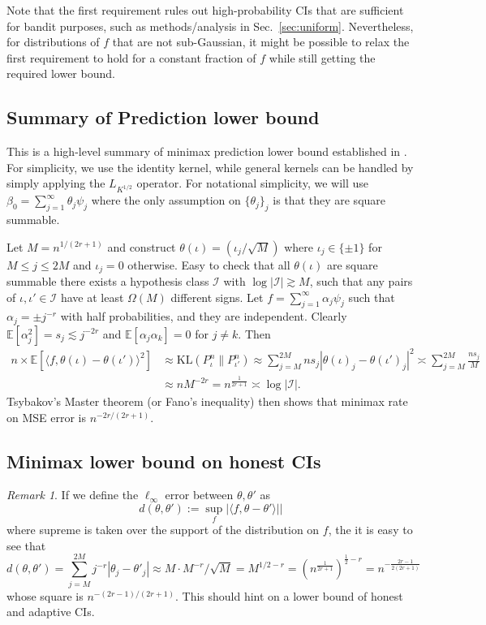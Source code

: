 \documentclass[11pt,a4paper]{article}
\theoremstyle{definition}
\theoremstyle{plain}
\theoremstyle{remark}
\newtheorem{remark}{Remark}[section]
\begin{document}
Note that the first requirement rules out high-probability CIs that are sufficient for bandit purposes, such as methods/analysis in Sec.~\ref{sec:uniform}.
Nevertheless, for distributions of $f$ that are not sub-Gaussian, it might be possible to relax the first requirement to hold for a constant fraction of $f$ while still getting the required lower bound.

\subsection{Summary of Prediction lower bound}

This is a high-level summary of minimax prediction lower bound established in \cite{cai2012minimax}. For simplicity, we use the identity kernel, while general kernels can be handled by simply
applying the $L_{K^{1/2}}$ operator. For notational simplicity, we will use $\beta_0=\sum_{j=1}^{\infty}\theta_j\psi_j$ where the only assumption on $\{\theta_j\}_j$ is that they are square summable.

Let $M=n^{1/(2r+1)}$ and construct $\theta(\iota) = (\iota_j/\sqrt{M})$ where $\iota_j\in\{\pm 1\}$ for $M\leq j\leq 2M$ and $\iota_j=0$ otherwise. Easy to check that all $\theta(\iota)$ are square summable
there exists a hypothesis class $\mathcal I$ with $\log|\mathcal I|\gtrsim M$, such that any pairs of $\iota,\iota'\in\mathcal I$ have at least $\Omega(M)$ different signs.
Let $f=\sum_{j=1}^{\infty}\alpha_j\psi_j$ such that $\alpha_j = \pm j^{-r}$ with half probabilities, and they are independent. Clearly $\mathbb E[\alpha_j^2]=s_j\lesssim j^{-2r}$ and $\mathbb E[\alpha_j\alpha_k]=0$ for $j\neq k$.
Then
\begin{align*}
n\times \mathbb E[\langle f,\theta(\iota)-\theta(\iota')\rangle^2] &\approx \mathrm{KL}(P_{\iota}^n\|P_{\iota'}^n) \approx \sum_{j=M}^{2M}ns_j|\theta(\iota)_j-\theta(\iota')_j|^2 \asymp \sum_{j=M}^{2M} \frac{ns_j}{M} \\
&\approx nM^{-2r} = n^{\frac{1}{2r+1}} \asymp \log|\mathcal I|.
\end{align*}
Tsybakov's Master theorem (or Fano's inequality) then shows that minimax rate on MSE error is $n^{-2r/(2r+1)}$.


\subsection{Minimax lower bound on honest CIs}

\begin{remark}
If we define the $\ell_{\infty}$ error between $\theta,\theta'$ as
$$
d(\theta,\theta') := \sup_{f} \big|\langle f,\theta-\theta'\rangle|\big|
$$
where supreme is taken over the support of the distribution on $f$, the it is easy to see that
$$
d(\theta,\theta') = \sum_{j=M}^{2M} j^{-r}|\theta_j-\theta'_j| \approx M\cdot M^{-r}/\sqrt{M} = M^{1/2-r} = \left(n^{\frac{1}{2r+1}}\right)^{\frac{1}{2}-r} = n^{-\frac{2r-1}{2(2r+1)}}
$$
whose square is $n^{-(2r-1)/(2r+1)}$. This should hint on a lower bound of honest and adaptive CIs.
\end{remark}
\end{document}
